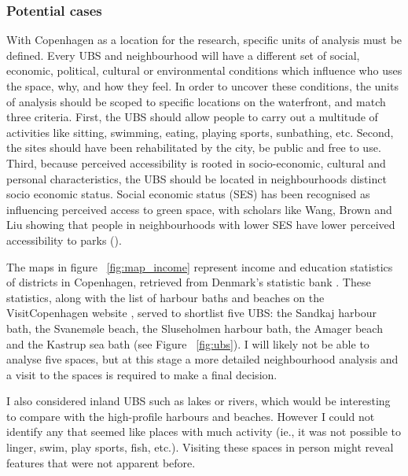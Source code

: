\documentclass{article}
\begin{document}
\subsubsection{Potential cases}

With Copenhagen as a location for the research, specific units of analysis must be defined. Every UBS and neighbourhood will have a different set of social, economic, political, cultural or environmental conditions which influence who uses the space, why, and how they feel. In order to uncover these conditions, the units of analysis should be scoped to specific locations on the waterfront, and match three criteria. 
First, the UBS should allow people to carry out a multitude of activities like sitting, swimming, eating, playing sports, sunbathing, etc. 
Second, the sites should have been rehabilitated by the city, be public and free to use. 
Third, because perceived accessibility is rooted in socio-economic, cultural and personal characteristics, the UBS should be located in neighbourhoods distinct socio economic status. Social economic status (SES) has been recognised as influencing perceived access to green space, with scholars like Wang, Brown and Liu showing that people in neighbourhoods with lower SES have lower perceived accessibility to parks (\citeyear{wang2015physical}).

The maps in figure ~\ref{fig:map_income} represent income and education statistics of districts in Copenhagen, retrieved from Denmark's statistic bank \parencite{copenhagenStatbank}. These statistics, along with the list of harbour baths and beaches on the VisitCopenhagen website \parencite{visitcopenhagen_baths}, served to shortlist five UBS: the Sandkaj harbour bath, the Svanemøle beach, the Sluseholmen harbour bath, the Amager beach and the Kastrup sea bath (see Figure ~\ref{fig:ubs}). I will likely not be able to analyse five spaces, but at this stage a more detailed neighbourhood analysis and a visit to the spaces is required to make a final decision. 

I also considered inland UBS such as lakes or rivers, which would be interesting to compare with the high-profile harbours and beaches. However I could not identify any that seemed like places with much activity (ie., it was not possible to linger, swim, play sports, fish, etc.). Visiting these spaces in person might reveal features that were not apparent before.
\end{document}

